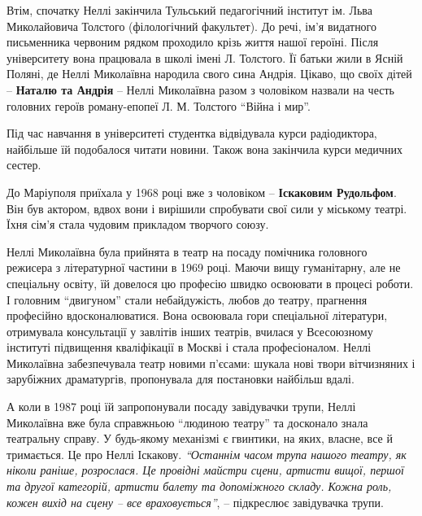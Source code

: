 Втім, спочатку Неллі закінчила Тульський педагогічний інститут ім. Льва
Миколайовича Толстого (філологічний факультет). До речі, ім'я видатного
письменника червоним рядком проходило крізь життя нашої героїні. Після
університету вона працювала в школі імені Л. Толстого. Її батьки жили в Ясній
Поляні, де Неллі Миколаївна народила свого сина Андрія. Цікаво, що своїх дітей
– \textbf{Наталю та Андрія} – Неллі Миколаївна разом з чоловіком назвали на честь
головних героїв роману-епопеї Л. М. Толстого \enquote{Війна і мир}.

Під час навчання в університеті студентка відвідувала курси радіодиктора,
найбільше їй подобалося читати новини. Також вона закінчила курси медичних
сестер.

До Маріуполя приїхала у 1968 році вже з чоловіком – \textbf{Іскаковим Рудольфом}. Він
був актором, вдвох вони і вирішили спробувати свої сили у міському театрі. Їхня
сім'я стала чудовим прикладом творчого союзу.


Неллі Миколаївна була прийнята в театр на посаду помічника головного режисера з
літературної частини в 1969 році. Маючи вищу гуманітарну, але не спеціальну
освіту, їй довелося цю професію швидко освоювати в процесі роботи. І головним
\enquote{двигуном} стали небайдужість, любов до театру, прагнення професійно
вдосконалюватися. Вона освоювала гори спеціальної літератури, отримувала
консультації у завлітів інших театрів, вчилася у Всесоюзному інституті
підвищення кваліфікації в Москві і стала професіоналом. Неллі Миколаївна
забезпечувала театр новими п'єсами: шукала нові твори вітчизняних і зарубіжних
драматургів, пропонувала для постановки найбільш вдалі.

А коли в 1987 році їй запропонували посаду завідувачки трупи, Неллі Миколаївна
вже була справжньою \enquote{людиною театру} та досконало знала театральну справу. У
будь-якому механізмі є гвинтики, на яких, власне, все й тримається. Це про
Неллі Іскакову. \emph{\enquote{Останнім часом трупа нашого театру, як ніколи раніше,
розрослася. Це провідні майстри сцени, артисти вищої, першої та другої
категорій, артисти балету та допоміжного складу. Кожна роль, кожен вихід на
сцену – все враховується}}, – підкреслює завідувачка трупи.

